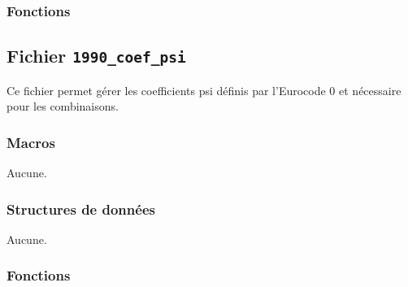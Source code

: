 \documentclass{article}
\begin{document}
\subsubsection{Fonctions}






















\subsection{Fichier {\texttt{1990\_coef\_psi}}}
Ce fichier permet gérer les coefficients psi définis par l'Eurocode 0 et nécessaire pour les combinaisons.
\subsubsection{Macros}
Aucune.
\subsubsection{Structures de données}
Aucune.
\subsubsection{Fonctions}


















\end{document}
